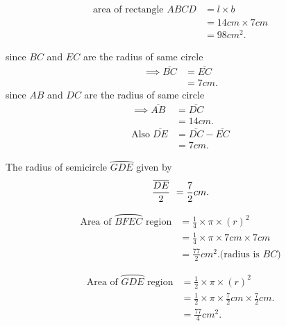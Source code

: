 \documentclass[journal,12pt,twocolumn]{IEEEtran}
\newcommand{\rectarea}[2]{#1 \times #2}
\newcommand{\semicirarea}[1]{\frac{1}{2} \times \pi \times (#1)^2}
\newcommand{\quatercirarea}[1]{\frac{1}{4} \times \pi \times (#1)^2}
\begin{document}
\begin{center}
      \begin{align}
      \text{area of rectangle $ABCD$}&= \rectarea{l}{b} \\
                 &= \rectarea{14cm}{7cm} \nonumber \\ 
                 &= 98cm^2. \nonumber
  \end{align}
\end{center}


  \begin{center}
   since $BC$ and $EC$ are the radius of same circle\\
   \begin{align}
       \implies \overline{BC} &= \overline{EC} \nonumber \\
                              &= 7cm.
   \end{align}
    since $AB$ and $DC$ are the radius of same circle\\
    \begin{align}
        \implies \overline{AB} &= \overline{DC} \nonumber \\
                               &= 14cm.\\
 \text{Also}\; \overline{DE} &= \overline{DC}-\overline{EC} \nonumber \\
                                    &=7cm.
    \end{align}
    \end{center}
The radius of semicircle $\wideparen{GDE}$ given by \\
\begin{equation}
    \frac{\overline{DE}}{2}\ = \frac{7}{2}cm. \\
\end{equation}
        
\begin{align}
\text{Area of $\wideparen{BFEC}$ region} &= \quatercirarea{r} \\
&= \frac{1}{4} \times \pi \times 7cm \times 7cm \nonumber \\ 
               &= \frac{77}{2}cm^2.\text{(radius is $BC$)} \nonumber 
\end{align}

\begin{align}
\text{Area of $\wideparen{GDE}$ region} &= \semicirarea{r} \\
               &=\frac{1}{2} \times \pi \times \frac{7}{2}cm \times \frac{7}{2}cm. \nonumber \\
                          &= \frac{77}{4}cm^2.\nonumber
\end{align}
      
\end{document}
